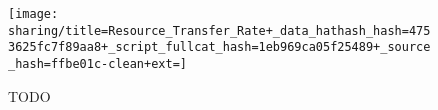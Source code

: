 \begin{figure*}[!htbp]
\begin{center}

\texttt{[image: sharing/title=Resource\_Transfer\_Rate+\_data\_hathash\_hash=4753625fc7f89aa8+\_script\_fullcat\_hash=1eb969ca05f25489+\_source\_hash=ffbe01c-clean+ext=]}

\caption{
TODO
}
\label{fig:sharing_channelmate}
\end{center}
\end{figure*}
